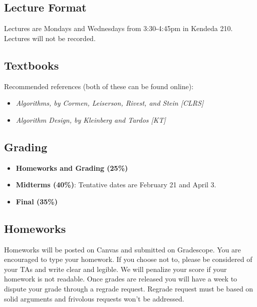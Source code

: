 \documentclass{article}
\begin{document}
\subsection*{Lecture Format}
    Lectures are Mondays and Wednesdays from 3:30-4:45pm in Kendeda 210. Lectures will not be recorded.

\subsection*{Textbooks}
    Recommended references (both of these can be found online):
    \begin{itemize}
        \item \textit{Algorithms, by Cormen, Leiserson, Rivest, and Stein [CLRS]}
        \item \textit{Algorithm Design, by Kleinberg and Tardos [KT]}
    \end{itemize}

\subsection*{Grading}
    \begin{itemize}
        \item \textbf{Homeworks and Grading (25\%)}
        \item \textbf{Midterms (40\%)}: Tentative dates are February 21 and April 3.
        \item \textbf{Final (35\%)}
    \end{itemize}

\subsection*{Homeworks}
    Homeworks will be posted on Canvas and submitted on Gradescope. You are encouraged to type your homework. If you choose not to, please be considered of your TAs and write clear and legible. We will penalize your score if your homework is not readable. Once grades are released you will have a week to dispute your grade through a regrade request. Regrade request must be based on solid arguments and frivolous requests won’t be addressed.
    
\end{document}
